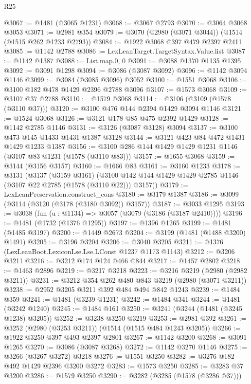 \begin{lexlean}{R25}
\begin{coremodule}
@3067 := @1481 (@3065 @1231)
@3068 := @3067 @2793
@3070 := @3064 @3068 @3053
@3071 := @2981 @354
@3079 := @3070 (@2980 (@3071 @3044)) (@1514 (@1515 @262 @1233 @2793))
@3084 := @1922 @3068 @397 @479 @2397 @2411
@3085 := @1142 @2788
@3086 := LexLeanTarget.TargetSyntax.Value.list
@3087 := @1142 @1387
@3088 := List.map.{0, 0}
@3091 := @3088 @1370 @1135 @1395
@3092 := @3091 @1298
@3094 := @3086 (@3087 @3092)
@3096 := @1142 @3094 @1146
@3099 := @3084 (@3085 @3096) @3052
@3100 := @1551 @3068
@3106 := @3100 @182 @478 @1429 @2396 @2788 @3096
@3107 := @1573 @3068
@3109 := @3107 @37 @2788
@3110 := @1579 @3068
@3114 := @3106 (@3109 (@1578 (@3110 @37)))
@3120 := @3100 @476 @144 @2394 @1429 @3094 @1146
@3121 := @1524 @3068
@3126 := @3121 @178 @85 @475 @2392 @1429
@3128 := @1142 @2785 @1146
@3131 := @3126 (@3087 @3128) @3094
@3137 := @3100 @473 @145 @1433 @1431 @1387 @3128
@3144 := @3121 @423 @84 @472 @1431 @1429 @1233 @1387
@3156 := @3100 @286 @144 @1429 @1429 @1231 @1146 (@3107 @83 @1231 (@1578 (@3110 @83)))
@3157 := @1655 @3068
@3159 := @3144 (@3156 @3157)
@3160 := @1666 @83
@3161 := @3160 @1233
@3178 := @3131
    (@3137
      (@3159 @3161)
      (@3100 @142 @144 @1429 @1429 @2785 @1146 (@3107 @22 @2785 (@1578 (@3110 @22))) @3157))
@3179 := LexLeanPreservation.construct_cons
@3180 := @3179 @1387
@3186 := @3099 (@3114 (@3120 (@3178 (@3180 @3092)) @3157))
@3187 := @3033 @1295
@3193 := @3038 (fun (u : @1134) => @3057 (@3079 (@3186 (@3187 @2410))))
@3196 := @1481 (@1732 (@1376 @1295))
@3197 := @1396 @1265
@3199 := @1481 (@1485 @3197)
@3200 := @1449 @2673
@3204 := @3199 (@1481 (@1488 @3200) @1491)
@3205 := @3196 @3204
@3206 := @3040 @3205
@3211 := @1376 (LexLeanBoot.LexiconLse.Lse.LConst @1237 @1173 @1143)
@3212 := @3206 @3211
@3216 := @3212 @174 @124 @466 @844
@3217 := @1457 @2802
@3218 := @1463 @2896
@3219 := @3217 @3218
@3223 := @3216 @3219 (@2980 (@2982 @3211))
@3231 := @3212 @354 @262 @480 @843 @3219 (@2980 (@3071 @3211))
@3238 := @2952 @3205 @3211 @392 @484 @494 @842 @1243
@3239 := @1484 @359
@3241 := @1481 (@3239 @1231)
@3242 := @1484 @341
@3244 := @1481 (@3242 @1240)
@3245 := @1484 @161
@3250 := @3241 (@3244 (@1481 (@3245 @1238) @3205))
@3252 := @3238 @3250 @3219
@3253 := @2981 @392
@3261 := @3252 (@2980 (@3253 @3211)) (@1514 (@1515 @484 @1243 @3205))
@3266 := @1922 @3250 @397 @493 @2397 @2801
@3267 := @1142 @3200
@3268 := @3091 @1265
@3270 := @3086 (@3087 @3268)
@3272 := @1142 @3270 @1146
@3275 := @3266 (@3267 @3272) @3218
@3276 := @1551 @3250
@3282 := @3276 @182 @492 @1429 @2396 @3200 @3272
@3283 := @1573 @3250
@3285 := @3283 @37 @3200
@3286 := @1579 @3250
@3290 := @3282 (@3285 (@1578 (@3286 @37)))

\end{coremodule}
\end{lexlean}
